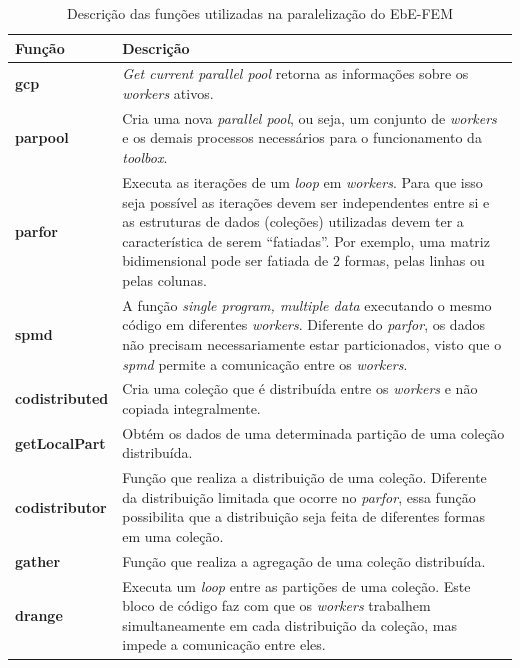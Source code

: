\documentclass[
    12pt,               %
    openright,          %
    oneside,
    a4paper,            %
    english,            %
    french,             %
    spanish,            %
    brazil              %
    ]{abntex2}
\begin{document}
\begin{table}[!ht]   
	\centering
	\begin{tabular}{|l|p{10cm}|}  
		\hline
		\textbf{Função} 
		& \textbf{Descrição} 
		\\  
		\hline
		\textbf{gcp} 
		& \textit{Get current parallel pool} retorna as informações sobre os \textit{workers} ativos.
		\\
		\hline
		\textbf{parpool}  
		& Cria uma nova \textit{parallel pool}, ou seja, um conjunto de \textit{workers} e os demais processos necessários para o funcionamento da \textit{toolbox}.
		\\
		\hline		
		\textbf{parfor} 
		& Executa as iterações de um \textit{loop} em \textit{workers}. Para que isso seja possível as iterações devem ser independentes entre si e as estruturas de dados (coleções) utilizadas devem ter a característica de serem ``fatiadas''.  Por exemplo, uma matriz bidimensional pode ser fatiada de $2$ formas, pelas linhas ou pelas colunas.
		\\
		\hline		 
		\textbf{spmd} 
		& A função \textit{single program, multiple data} executando o mesmo código em diferentes \textit{workers}. Diferente do \textit{parfor}, os dados não precisam necessariamente estar particionados, visto que o \textit{spmd} permite a comunicação entre os \textit{workers}.
		\\
		\hline		
		\textbf{codistributed} 
		& Cria uma coleção que é distribuída entre os \textit{workers} e não copiada integralmente.
		\\
		\hline		 
		\textbf{getLocalPart} 
		& Obtém os dados de uma determinada partição de uma coleção distribuída.
		\\
		\hline	
		\textbf{codistributor}
		& Função que realiza a distribuição de uma coleção. Diferente da distribuição limitada que ocorre no \textit{parfor}, essa função possibilita que a distribuição seja feita de diferentes formas em uma coleção. 
		\\
		\hline
		\textbf{gather}
		& Função que realiza a agregação de uma coleção distribuída.
		\\
		\hline
		\textbf{drange}  
		& Executa um \textit{loop} entre as partições de uma coleção. Este bloco de código faz com que os \textit{workers} trabalhem simultaneamente em cada distribuição da coleção, mas impede a comunicação entre eles.
		\\
		\hline	
	\end{tabular}
	\caption{Descrição das funções utilizadas na paralelização do EbE-FEM}
	\label{tab:partool}
\end{table}
\end{document}

